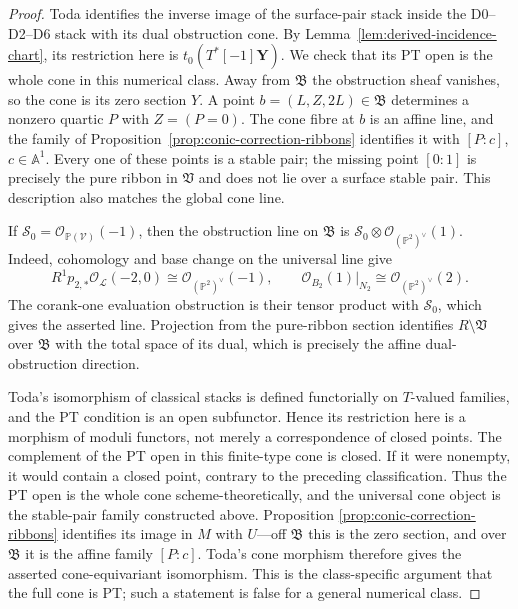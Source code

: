 \documentclass[11pt,reqno]{amsart}
\theoremstyle{definition}
\newcommand{\Pp}{\mathbb P}
\newcommand{\Ocal}{\mathcal O}
\begin{document}
\begin{proof}
Toda identifies the inverse image of the surface-pair stack inside the
D0--D2--D6 stack with its dual obstruction cone.  By
Lemma~\ref{lem:derived-incidence-chart}, its restriction here is
$t_0(T^*[-1]\mathbf Y)$.  We check
that its PT open is the whole cone in this numerical class.  Away from
$\mathfrak B$ the obstruction sheaf vanishes, so the cone is its zero
section $Y$.  A point $b=(L,Z,2L)\in\mathfrak B$ determines a nonzero
quartic $P$ with $Z=(P=0)$.  The cone fibre at $b$ is an affine line, and the
family of Proposition~\ref{prop:conic-correction-ribbons} identifies it with
$[P:c]$, $c\in\mathbb A^1$.  Every one of these points is a stable pair; the
missing point $[0:1]$ is precisely the pure ribbon in $\mathfrak V$ and does
not lie over a surface stable pair.  This description also matches the
global cone line.

If
$\mathcal S_0=\Ocal_{\Pp(\mathcal V)}(-1)$, then the obstruction line on
$\mathfrak B$ is
$\mathcal S_0\otimes\Ocal_{(\Pp^2)^\vee}(1)$.  Indeed, cohomology and base
change on the universal line give
\[
 R^1p_{2,*}\Ocal_{\mathcal L}(-2,0)
 \cong\Ocal_{(\Pp^2)^\vee}(-1),
 \qquad
 \Ocal_{B_2}(1)|_{N_2}
 \cong\Ocal_{(\Pp^2)^\vee}(2).
\]
The corank-one evaluation obstruction is their tensor product with
$\mathcal S_0$, which gives the asserted line.  Projection from the pure-ribbon
section identifies $R\setminus\mathfrak V$ over $\mathfrak B$ with the
total space of its dual, which is precisely the affine dual-obstruction
direction.

Toda's isomorphism of classical stacks is defined functorially on
$T$-valued families, and the PT condition is an open subfunctor.  Hence its
restriction here is a morphism of moduli functors, not merely a
correspondence of closed points.  The
complement of the PT open in this finite-type cone is closed.  If it were
nonempty, it would contain a closed point, contrary to the preceding
classification.  Thus the PT open is the whole cone scheme-theoretically,
and the universal cone object is the stable-pair family constructed above.
Proposition
\ref{prop:conic-correction-ribbons} identifies its image in $M$ with
$U$---off $\mathfrak B$ this is the zero section, and over $\mathfrak B$ it
is the affine family $[P:c]$.  Toda's cone morphism therefore gives the
asserted cone-equivariant isomorphism.  This is the class-specific argument
that the full cone is PT; such a statement is false for a general numerical
class.


\end{proof}
\end{document}
